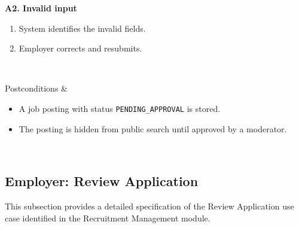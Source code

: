 \begin{usecasespectable}
	\textbf{A2. Invalid input}
	\begin{enumerate}
		\item System identifies the invalid fields.
		\item Employer corrects and resubmits.
	\end{enumerate}
	\\ \hline

	Postconditions &
	\begin{itemize}
		\item A job posting with status \texttt{PENDING\_APPROVAL} is stored.
		\item The posting is hidden from public search until approved by a moderator.
	\end{itemize}
	\\ \hline

\end{usecasespectable}

\newpage
\subsection{Employer: Review Application}

This subsection provides a detailed specification of the Review Application use case identified in the Recruitment Management module.

